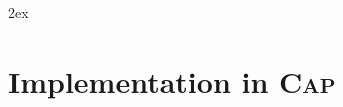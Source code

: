 \documentclass{article}
\begin{document}

\begingroup
     \parindent 0pt
     \parskip 2ex
     \def\enotesize{\normalsize}
     \theendnotes
\endgroup 



\appendix
\renewcommand{\thesection}{\Alph{section}}
\section{Implementation in \textsc{Cap}}

\end{document}
